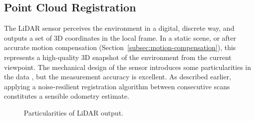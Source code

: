 \subsection{Point Cloud Registration}
\label{subsec:registration}

The LiDAR sensor perceives the environment in a digital, discrete way, and outputs a set of 3D coordinates in the local frame. In a static scene, or after accurate motion compensation (Section~\ref{subsec:motion-compensation}), this represents a high-quality 3D snapshot of the environment from the current viewpoint. The mechanical design of the sensor introduces some particularities in the data , but the measurement accuracy is excellent. As described earlier, applying a noise-resilient registration algorithm between consecutive scans constitutes a sensible odometry estimate.

\begin{figure}
	\centering
	\hfill
	\caption[Particularities of LiDAR output]{Particularities of LiDAR output.}
	\label{fig:pcd-effects}
\end{figure}

